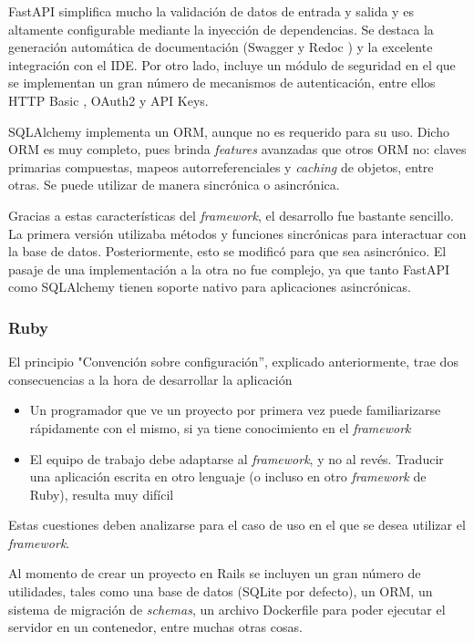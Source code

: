 \documentclass[11pt]{article}
\let\Oldsubsubsection\subsubsection
\renewcommand{\subsubsection}{\FloatBarrier\Oldsubsubsection}
\newcommand{\english}[1]{\textit{#1}}
\begin{document}
FastAPI simplifica mucho la validación de datos de entrada y salida y es altamente configurable mediante la inyección de dependencias. Se destaca la generación automática de documentación (Swagger \cite{http:swagger} y Redoc \cite{http:redoc}) y la excelente integración con el IDE. Por otro lado, incluye un módulo de seguridad en el que se implementan un gran número de mecanismos de autenticación, entre ellos HTTP Basic \cite{http:basic_auth}, OAuth2 \cite{http:oauth2} y API Keys.

SQLAlchemy implementa un ORM, aunque no es requerido para su uso. Dicho ORM es muy completo, pues brinda \english{features} avanzadas que otros ORM no: claves primarias compuestas, mapeos autorreferenciales y \english{caching} de objetos, entre otras. Se puede utilizar de manera sincrónica o asincrónica.

Gracias a estas características del \english{framework}, el desarrollo fue bastante sencillo. La primera versión utilizaba métodos y funciones sincrónicas para interactuar con la base de datos. Posteriormente, esto se modificó para que sea asincrónico. El pasaje de una implementación a la otra no fue complejo, ya que tanto FastAPI como SQLAlchemy tienen soporte nativo para aplicaciones asincrónicas.

\subsubsection{Ruby}

El principio "Convención sobre configuración'', explicado anteriormente, trae dos consecuencias a la hora de desarrollar la aplicación
\begin{itemize}
    \item Un programador que ve un proyecto por primera vez puede familiarizarse rápidamente con el mismo, si ya tiene conocimiento en el \english{framework}
    \item El equipo de trabajo debe adaptarse al \english{framework}, y no al revés. Traducir una aplicación escrita en otro lenguaje (o incluso en otro \english{framework} de Ruby), resulta muy difícil
\end{itemize}
Estas cuestiones deben analizarse para el caso de uso en el que se desea utilizar el \english{framework}.

Al momento de crear un proyecto en Rails se incluyen un gran número de utilidades, tales como una base de datos (SQLite \cite{http:sqlite} por defecto), un ORM, un sistema de migración de \english{schemas}, un archivo Dockerfile para poder ejecutar el servidor en un contenedor, entre muchas otras cosas.
\end{document}
